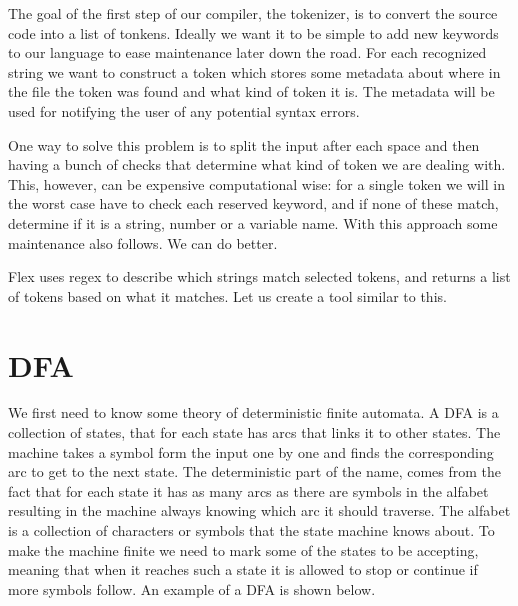 The goal of the first step of our compiler, the tokenizer, is to convert the source code into a list of tonkens. Ideally we want it to be simple to add new keywords to our language to ease maintenance later down the road. For each recognized string we want to construct a token which stores some metadata about where in the file the token was found and what kind of token it is. The metadata will be used for notifying the user of any potential syntax errors.

One way to solve this problem is to split the input after each space and then having a bunch of checks that determine what kind of token we are dealing with. This, however, can be expensive computational wise: for a single token we will in the worst case have to check each reserved keyword, and if none of these match, determine if it is a string, number or a variable name. With this approach some maintenance also follows. We can do better. 

Flex uses regex to describe which strings match selected tokens, and returns a list of tokens based on what it matches. Let us create a tool similar to this.

\section{DFA}
We first need to know some theory of deterministic finite automata. A DFA is a collection of states, that for each state has arcs that links it to other states. The machine takes a symbol form the input one by one and finds the corresponding arc to get to the next state. The deterministic part of the name, comes from the fact that for each state it has as many arcs as there are symbols in the alfabet resulting in the machine always knowing which arc it should traverse. The alfabet is a collection of characters or symbols that the state machine knows about. To make the machine finite we need to mark some of the states to be accepting, meaning that when it reaches such a state it is allowed to stop or continue if more symbols follow. An example of a DFA is shown below.

\begin{center}
\end{center}

